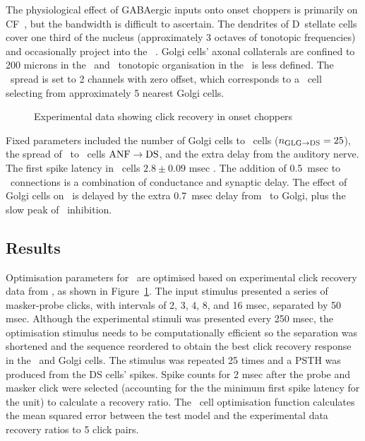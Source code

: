 The physiological effect of GABAergic inputs onto onset choppers is primarily on CF~\citep{CasparyHaveyEtAl:1979,PalombiCaspary:1992,CasparyBackoffEtAl:1994,CasparyPalombi:1993,CasparyPalombiEtAl:1993}, but the bandwidth is difficult to ascertain.
The dendrites of D~stellate cells cover one third of the nucleus (approximately 3 octaves of tonotopic frequencies) and occasionally project into the \GCD~\citep{ArnottWallaceEtAl:2004}.
Golgi cells' axonal collaterals are confined to 200 microns in the \GCD~and \ANF~tonotopic organisation in the \GCD~is less defined.
The \GLGDS~spread is set to 2 channels with zero offset, which corresponds to a \DS~cell selecting from approximately 5 nearest Golgi cells.

\begin{figure}[htb]
  \centering
  \caption{Experimental data showing click recovery in onset choppers}\label{fig:BackoffPalombi}
\end{figure}

Fixed parameters included  the number of Golgi cells to \DS~cells ($\protect n_{\protect\textrm{{GLG}}\to\textrm{{DS}}} = 25$), the spread of \ANFs~to \DS~cells $\protect\textrm{{ANF}}\to\textrm{{DS}}$, and the extra delay from the auditory nerve.
The first spike latency in \DS~cells $2.8 \pm 0.09$ msec \citep{RhodeSmith:1986}.
The addition of 0.5~msec to \ANFDS~connections is a combination of conductance and synaptic delay.
The effect of Golgi cells on \DS~is delayed by the extra 0.7~msec delay from \ANF~to Golgi, plus the slow peak of \GABAa~inhibition.

\subsection{Results}    \label{sec:DS:results}

Optimisation parameters for \GLGDS~are optimised based on experimental click recovery data from \citep{BackoffPalombiEtAl:1997}, as shown in Figure~\ref{fig:BackoffPalombi}.
The input stimulus presented a series of masker-probe clicks, with intervals of 2, 3, 4, 8, and 16 msec, separated by 50 msec.
Although the experimental stimuli was presented every 250 msec, the optimisation stimulus needs to be computationally efficient so the separation was shortened and the sequence reordered to obtain the best click recovery response in the \DS~and Golgi cells.
The stimulus was repeated 25 times and a PSTH was produced from the DS cells' spikes.
Spike counts for 2 msec after the probe and masker click were selected (accounting for the the minimum first spike latency for the unit) to calculate a recovery ratio.
The \DS~cell optimisation function calculates the mean squared error between the test model and the experimental data recovery ratios to 5 click pairs.


